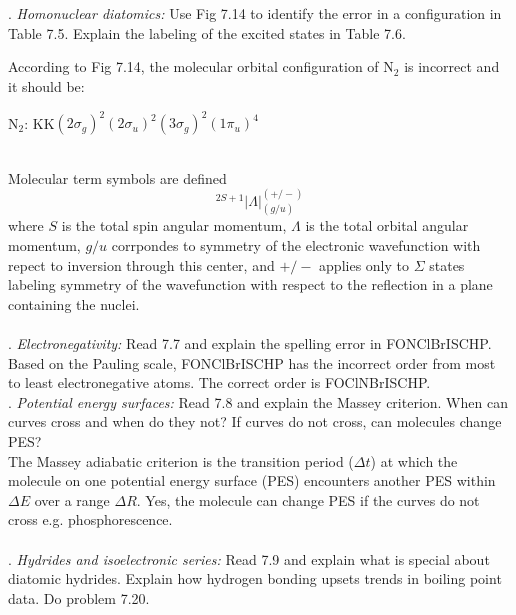 \documentclass{article}
\begin{document}
  \\
  \\
  . \textit{Homonuclear diatomics:} Use Fig 7.14 to identify the error in a configuration
  in Table 7.5. Explain the labeling of the excited states in Table 7.6.
  \\

  {\color{blue}
  According to Fig 7.14, the molecular orbital configuration of N$_2$ is incorrect and it
  should be:

  N$_2$: KK$(2\sigma_g)^2(2\sigma_u)^2(3\sigma_g)^2(1\pi_u)^4$}
  \\

  {\color{blue}
  Molecular term symbols are defined
  \begin{equation*}
    ^{2S+1}|\Lambda|_{(g/u)}^{(+/-)}
  \end{equation*}
  \noindent where $S$ is the total spin angular momentum, $\Lambda$ is the total orbital
  angular momentum, $g/u$ corrpondes to symmetry of the electronic wavefunction with repect
  to inversion through this center, and $+/-$ applies only to $\Sigma$ states labeling
  symmetry of the wavefunction with respect to the reflection in a plane containing the
  nuclei.}
  \\
  \\
  . \textit{Electronegativity:} Read 7.7 and explain the spelling error in FONClBrISCHP.
  \\

  {\color{blue}
  Based on the Pauling scale, FONClBrISCHP has the incorrect order from most to least electronegative
  atoms. The correct order is FOClNBrISCHP.}
  \\
  
  . \textit{Potential energy surfaces:} Read 7.8 and explain the Massey criterion.
  When can curves cross and when do they not? If curves do not cross, can molecules change
  PES?
  \\
  
  {\color{blue}
  The Massey adiabatic criterion is the transition period ($\Delta t$) at which the molecule
  on one potential energy surface (PES) encounters another PES within $\Delta E$ over a range
  $\Delta R$. Yes, the molecule can change PES if the curves do not cross e.g. phosphorescence.}
  \\
  \\
  . \textit{Hydrides and isoelectronic series:} Read 7.9 and explain what is special
  about diatomic hydrides. Explain how hydrogen bonding upsets trends in boiling point
  data. Do problem 7.20.
  \\
  
\end{document}
